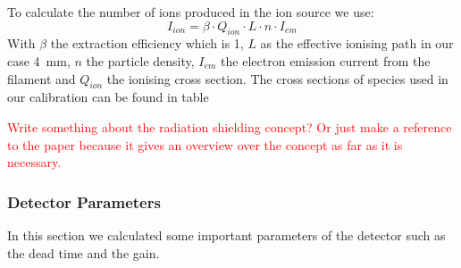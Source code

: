 
		To calculate the number of ions produced in the ion source we use:
		\begin{equation}
		I_{ion} = \beta\cdot Q_{ion}\cdot L\cdot n\cdot I_{em}
		\end{equation}
		With $\beta$ the extraction efficiency which is 1, %
		$L$ as the effective ionising path in our case 4~\si{\milli\metre}, $n$ the particle density, $I_{em}$ the electron emission current from the filament and $Q_{ion}$ the ionising cross section. The cross sections of species used in our calibration can be found in table %
		
		\textcolor{red}{Write something about the radiation shielding concept? Or just make a reference to the paper because it gives an overview over the concept as far as it is necessary.}
		
		\subsubsection{Detector Parameters } %
		
		
		In this section we calculated some important parameters of the detector such as the dead time and the gain. %
		
